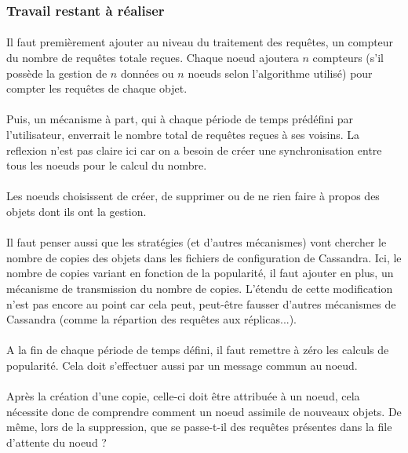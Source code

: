 \documentclass[12pt]{article}
\begin{document}
\subsubsection*{Travail restant à réaliser}

\paragraph{}Il faut premièrement ajouter au niveau du traitement des requêtes, un compteur du nombre de requêtes totale reçues. Chaque noeud ajoutera $n$ compteurs (s'il possède la gestion de $n$ données ou $n$ noeuds selon l'algorithme utilisé) pour compter les requêtes de chaque objet.

\paragraph{}Puis, un mécanisme à part, qui à chaque période de temps prédéfini par l'utilisateur, enverrait le nombre total de requêtes reçues à ses voisins. La reflexion n'est pas claire ici car on a besoin de créer une synchronisation entre tous les noeuds pour le calcul du nombre.

\paragraph{}Les noeuds choisissent de créer, de supprimer ou de ne rien faire à propos des objets dont ils ont la gestion.

\paragraph{}Il faut penser aussi que les stratégies (et d'autres mécanismes) vont chercher le nombre de copies des objets dans les fichiers de configuration de Cassandra. Ici, le nombre de copies variant en fonction de la popularité, il faut ajouter en plus, un mécanisme de transmission du nombre de copies. L'étendu de cette modification n'est pas encore au point car cela peut, peut-être fausser d'autres mécanismes de Cassandra (comme la répartion des requêtes aux réplicas...).

\paragraph{}A la fin de chaque période de temps défini, il faut remettre à zéro les calculs de popularité. Cela doit s'effectuer aussi par un message commun au noeud.

\paragraph{}Après la création d'une copie, celle-ci doit être attribuée à un noeud, cela nécessite donc de comprendre comment un noeud assimile de nouveaux objets. De même, lors de la suppression, que se passe-t-il des requêtes présentes dans la file d'attente du noeud ?
\end{document}
